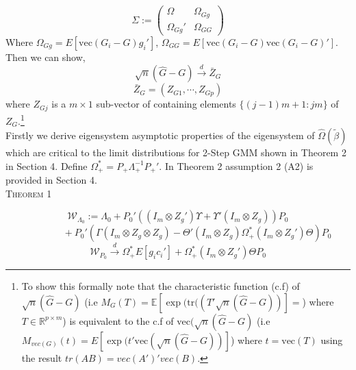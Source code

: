 \documentclass[11pt, fleqn]{article}
\begin{document}
\begin{equation} \Sigma :=\left(\begin{array}{cc} \Omega & \Omega_{Gg} \\ \Omega_{Gg}' & \Omega_{GG}\end{array}\right)\end{equation}
Where $\Omega_{Gg}=E[\textrm{vec}(G_i-G)g_i']$, $\Omega_{GG}=E[\textrm{vec}(G_i-G)\textrm{vec}(G_i-G)']$.
Then we can show,
\begin{equation} \sqrt{n}(\hat{G}-G)\overset{d}{\rightarrow} \bar{Z}_G \end{equation}
\begin{equation} \bar{Z}_G= \left(  Z_{G1}, \cdots, Z_{Gp} \right) \end{equation}
where $Z_{Gj}$ is a $m\times 1$ sub-vector of containing  elements $\{(j-1)m+1:jm\}$ of $Z_G$.\footnote{To show this formally note that the characteristic function (c.f) of $\sqrt{n}(\hat{G}-G)$ (i.e $M_{G}(T)=\mathbb{E}[\exp(\textrm{tr}((T'\sqrt{n}(\hat{G}-G))]=$)  where $ T \in \mathbb{R}^{p \times m}$) is equivalent to the c.f of $\textrm{vec}(\sqrt{n}(\hat{G}-G)$ (i.e $M_{vec(G)}(t)=E[\exp(t'\textrm{vec}(\sqrt{n}(\hat{G}-G))]$) where $t=\textrm{vec}(T)$ using the result $tr(AB)=vec(A')'vec(B)$.}\\

Firstly we derive eigensystem asymptotic properties of  the eigensystem of $\hat{\Omega}(\tilde{\beta})$ which are critical to the limit distributions for 2-Step GMM shown in Theorem 2 in Section 4. Define $\Omega_+^*=P_+\Lambda_+^{-1}P_+'$. In Theorem 2 assumption 2 (A2) is provided in Section 4.\\

\textsc{Theorem 1}

\begin{equation*} \mathcal{W}_{\Lambda_0}:=\Lambda_0+ P_0' \left( (I_m\otimes Z_g')\Upsilon+\Upsilon'(I_m \otimes Z_g)\right)P_0\end{equation*}
 \begin{equation} \label{negvallim}\qquad \qquad +P_0'\left(\Gamma(I_m\otimes Z_g\otimes Z_g)- \Theta'(I_m \otimes Z_{g})\Omega_+^*(I_{m}\otimes Z_{g}')\Theta\right)
 P_0
\end{equation}
\begin{equation}\label{negveclim} \mathcal{W}_{P_0}\overset{d}{\rightarrow} \Omega_+^*E[g_ic_i']+\Omega_+^*(I_{m}\otimes Z_{g}')\Theta P_0 \end{equation}
\end{document}
